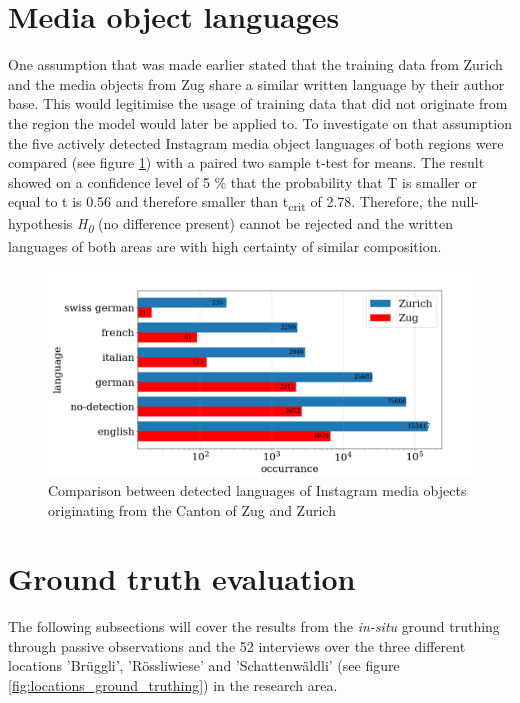 \section{Media object languages}
One assumption that was made earlier stated that the training data from Zurich and the media objects from Zug share a similar written language by their author base. This would legitimise the usage of training data that did not originate from the region the model would later be applied to. To investigate on that assumption the five actively detected Instagram media object languages of both regions were compared (see figure \ref{fig:det_languages}) with a paired two sample t-test for means. The result showed on a confidence level of 5 \% that the probability that T is smaller or equal to t is 0.56 and therefore smaller than t\textsubscript{crit} of 2.78. Therefore, the null-hypothesis \textit{H\textsubscript{0}} (no difference present) cannot be rejected and the written languages of both areas are with high certainty of similar composition.

\begin{figure}[h!]
   \centering
   \includegraphics[width=\textwidth]{img/det_languages_bigger_font.pdf}
   \caption{Comparison between detected languages of Instagram media objects originating from the Canton of Zug and Zurich}
   \label{fig:det_languages}
\end{figure}

\section{Ground truth evaluation}
The following subsections will cover the results from the \textit{in-situ} ground truthing through passive observations and the 52 interviews over the three different locations 'Br\"uggli', 'R\"ossliwiese' and 'Schattenw\"aldli' (see figure \ref{fig:locations_ground_truthing}) in the research area. \\

